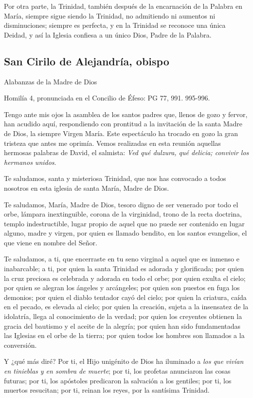 \begin{body}
\begin{body}
Por otra parte, la Trinidad, también después de la encarnación de la Palabra en María, siempre sigue siendo la Trinidad, no admitiendo ni aumentos ni disminuciones; siempre es perfecta, y en la Trinidad se reconoce una única Deidad, y así la Iglesia confiesa a un único Dios, Padre de la Palabra.

\subsection{San Cirilo de Alejandría, obispo }

Alabanzas de la Madre de Dios

Homilía 4, pronunciada en el Concilio de Éfeso: PG 77, 991. 995-996.

Tengo ante mis ojos la asamblea de los santos padres que, llenos de gozo y fervor, han acudido aquí, respondiendo con prontitud a la invitación de la santa Madre de Dios, la siempre Virgen María. Este espectáculo ha trocado en gozo la gran tristeza que antes me oprimía. Vemos realizadas en esta reunión aquellas hermosas palabras de David, el salmista: \emph{Ved qué dulzura, qué delicia; convivir los hermanos unidos}.

Te saludamos, santa y misteriosa Trinidad, que nos has convocado a todos nosotros en esta iglesia de santa María, Madre de Dios.

Te saludamos, María, Madre de Dios, tesoro digno de ser venerado por todo el orbe, lámpara inextinguible, corona de la virginidad, trono de la recta doctrina, templo indestructible, lugar propio de aquel que no puede ser contenido en lugar alguno, madre y virgen, por quien es llamado bendito, en los santos evangelios, el que viene en nombre del Señor.

Te saludamos, a ti, que encerraste en tu seno virginal a aquel que es inmenso e inabarcable; a ti, por quien la santa Trinidad es adorada y glorificada; por quien la cruz preciosa es celebrada y adorada en todo el orbe; por quien exulta el cielo; por quien se alegran los ángeles y arcángeles; por quien son puestos en fuga los demonios; por quien el diablo tentador cayó del cielo; por quien la criatura, caída en el pecado, es elevada al cielo; por quien la creación, sujeta a la insensatez de la idolatría, llega al conocimiento de la verdad; por quien los creyentes obtienen la gracia del bautismo y el aceite de la alegría; por quien han sido fundamentadas las Iglesias en el orbe de la tierra; por quien todos los hombres son llamados a la conversión.

Y ¿qué más diré? Por ti, el Hijo unigénito de Dios ha iluminado a \emph{los que vivían en tinieblas y en sombra de muerte}; por ti, los profetas anunciaron las cosas futuras; por ti, los apóstoles predicaron la salvación a los gentiles; por ti, los muertos resucitan; por ti, reinan los reyes, por la santísima Trinidad.


\end{body}
\end{body}
